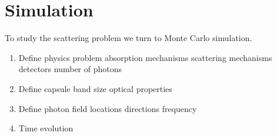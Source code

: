 \chapter{\label{ch:simulation}Simulation}

To study the scattering problem we turn to Monte Carlo simulation.
\begin{enumerate}
%
\item Define physics problem
\subitem absorption mechanisms
\subitem scattering mechanisms
\subitem detectors
\subitem number of photons
%
\item Define capsule
\subitem band size
\subitem optical properties
%
\item Define photon field
\subitem locations
\subitem directions
\subitem frequency 
%
\item Time evolution
%
\end{enumerate}







\endinput %
